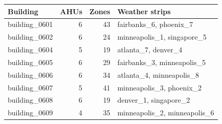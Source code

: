 \begin{tabular}{lrrl}
\toprule
Building & AHUs & Zones & Weather strips \\
\midrule
building\_0601 & 6 & 43 & fairbanks\_6, phoenix\_7 \\
building\_0602 & 6 & 24 & minneapolis\_1, singapore\_5 \\
building\_0604 & 5 & 19 & atlanta\_7, denver\_4 \\
building\_0605 & 6 & 29 & fairbanks\_3, minneapolis\_5 \\
building\_0606 & 6 & 34 & atlanta\_4, minneapolis\_8 \\
building\_0607 & 5 & 41 & minneapolis\_3, phoenix\_2 \\
building\_0608 & 6 & 19 & denver\_1, singapore\_2 \\
building\_0609 & 4 & 35 & minneapolis\_2, minneapolis\_6 \\
\bottomrule
\end{tabular}